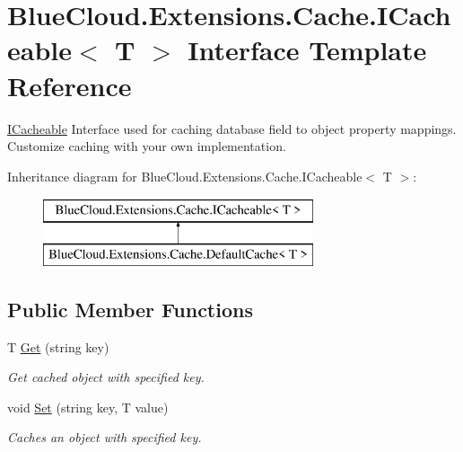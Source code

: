 \hypertarget{interface_blue_cloud_1_1_extensions_1_1_cache_1_1_i_cacheable}{}\section{Blue\+Cloud.\+Extensions.\+Cache.\+I\+Cacheable$<$ T $>$ Interface Template Reference}
\label{interface_blue_cloud_1_1_extensions_1_1_cache_1_1_i_cacheable}


\mbox{\hyperlink{interface_blue_cloud_1_1_extensions_1_1_cache_1_1_i_cacheable}{I\+Cacheable}} Interface used for caching database field to object property mappings. Customize caching with your own implementation.  


Inheritance diagram for Blue\+Cloud.\+Extensions.\+Cache.\+I\+Cacheable$<$ T $>$\+:\begin{figure}[H]
\begin{center}
\leavevmode
\includegraphics[height=2.000000cm]{interface_blue_cloud_1_1_extensions_1_1_cache_1_1_i_cacheable}
\end{center}
\end{figure}
\subsection*{Public Member Functions}
\begin{DoxyCompactItemize}
\item 
T \mbox{\hyperlink{interface_blue_cloud_1_1_extensions_1_1_cache_1_1_i_cacheable_aadcdce6338f6c4aaafc6c3068c4b6dc1}{Get}} (string key)
\begin{DoxyCompactList}\small\item\em Get cached object with specified key. \end{DoxyCompactList}\item 
void \mbox{\hyperlink{interface_blue_cloud_1_1_extensions_1_1_cache_1_1_i_cacheable_a668a7dff25dcd6a612830c4d15fe73cb}{Set}} (string key, T value)
\begin{DoxyCompactList}\small\item\em Caches an object with specified key. \end{DoxyCompactList}\end{DoxyCompactItemize}


